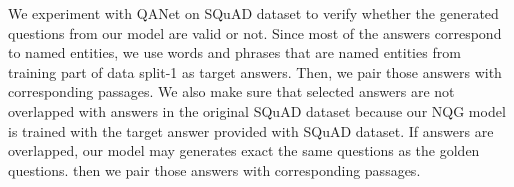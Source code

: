 \documentclass[letterpaper]{article} %
\begin{document}
We experiment with QANet \cite{yu2018qanet} on SQuAD dataset to verify whether the generated questions from our model are valid or not. Since most of the answers correspond to named entities, we use words and phrases that are named entities from training part of data split-1 as target answers. Then, we pair those answers with corresponding passages. We also make sure that selected answers are not overlapped with answers in the original SQuAD dataset because our NQG model is trained with the target answer provided with SQuAD dataset. If answers are overlapped, our model may generates exact the same questions as the golden questions. then we pair those answers with corresponding passages.
%
%
%
%
%
\end{document}
